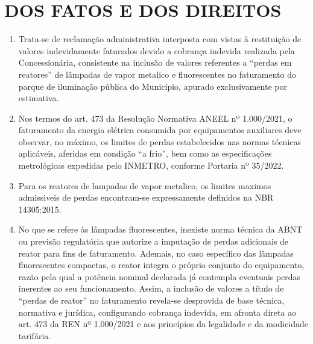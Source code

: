 \newcommand{\tipoRequerimento}{cobrança indevida por perda nos reatores de lâmpadas}

\newif\ifperdaVapor
\perdaVaportrue

\newif\ifperdaFluorescente
\perdaFluorescentetrue

\section{DOS FATOS E DOS DIREITOS}

\begin{enumerate}[resume]
\item 
Trata-se de reclamação administrativa interposta com vistas à restituição de valores indevidamente faturados devido a cobrança indevida realizada pela Concessionária, consistente na inclusão de valores referentes a “perdas em reatores” de lâmpadas de vapor metalico e fluorescentes no faturamento do parque de iluminação pública do Município, apurado exclusivamente por estimativa.

\item 
Nos termos do art. 473 da Resolução Normativa ANEEL nº 1.000/2021, o faturamento da energia elétrica consumida por equipamentos auxiliares deve observar, no máximo, os limites de perdas estabelecidos nas normas técnicas aplicáveis, aferidas em condição “a frio”, bem como as especificações metrológicas expedidas pelo INMETRO, conforme Portaria nº 35/2022.

\ifperdaVapor
\item %
Para os reatores de lampadas de vapor metalico, os limites maximos admissiveis de perdas encontram-se expressamente definidos na NBR 14305:2015.
\fi

\ifperdaFluorescente
\item %
No que se refere às lâmpadas fluorescentes, inexiste norma técnica da ABNT ou previsão regulatória que autorize a imputação de perdas adicionais de reator para fins de faturamento. Ademais, no caso específico das lâmpadas fluorescentes compactas, o reator integra o próprio conjunto do equipamento, razão pela qual a potência nominal declarada já contempla eventuais perdas inerentes ao seu funcionamento. Assim, a inclusão de valores a título de “perdas de reator” no faturamento revela-se desprovida de base técnica, normativa e jurídica, configurando cobrança indevida, em afronta direta ao art. 473 da REN nº 1.000/2021 e aos princípios da legalidade e da modicidade tarifária. 
\fi


\end{enumerate}
